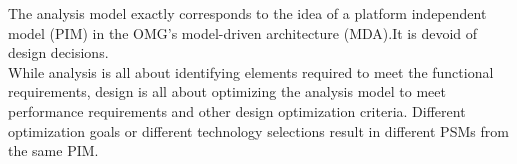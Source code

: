 \documentclass[12pt,a4paper]{article}
\begin{document}
The analysis model exactly corresponds to the idea of a platform independent
model (PIM) in the OMG’s model-driven architecture (MDA).It is devoid of
design decisions. \\ 

While analysis is all about identifying elements required to meet the functional
requirements, design is all about optimizing the analysis model to meet performance
requirements and other design optimization criteria. Different optimization goals
or different technology selections result in different PSMs from the same PIM.
\end{document}
